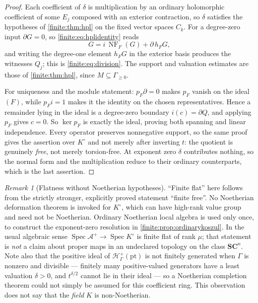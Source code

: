 \documentclass[11pt,letterpaper]{article}
\theoremstyle{definition}
\theoremstyle{remark}
\newtheorem{remark}[theorem]{Remark}
\newcommand{\SC}{\mathbf{SC}}
\newcommand{\Hp}{\mathscr H^{+}}
\newcommand{\Alg}{\mathcal A}
\newcommand{\Kc}{K^{\circ}}
\DeclareMathOperator{\NF}{NF}
\DeclareMathOperator{\Spec}{Spec}
\numberwithin{equation}{section}
\begin{document}
\begin{proof}
Each coefficient of $\delta$ is multiplication by an ordinary holomorphic coefficient of some $E_j$ composed with an exterior contraction, so $\delta$ satisfies the hypotheses of \cref{finite:thm:hpl} on the fixed vector spaces $C_k$. For a degree-zero input $\partial G=0$, so \eqref{finite:eq:hplidentity} reads
\[
 G=i\,\NF_F(G)+\partial\,h_FG,
\]
and writing the degree-one element $h_FG$ in the exterior basis produces the witnesses $Q_j$; this is \eqref{finite:eq:division}. The support and valuation estimates are those of \cref{finite:thm:hpl}, since $M\subseteq\Gamma_{\geq0}$.

For uniqueness and the module statement: $p_F\partial=0$ makes $p_F$ vanish on the ideal $(F)$, while $p_Fi=1$ makes it the identity on the chosen representatives. Hence a remainder lying in the ideal is a degree-zero boundary $i(c)=\partial Q$, and applying $p_F$ gives $c=0$. So $\ker p_F$ is exactly the ideal, proving both spanning and linear independence. Every operator preserves nonnegative support, so the same proof gives the assertion over $\Kc$ and not merely after inverting $t$: the quotient is genuinely \emph{free}, not merely torsion-free. At exponent zero $\delta$ contributes nothing, so the normal form and the multiplication reduce to their ordinary counterparts, which is the last assertion.
\end{proof}

\begin{remark}[Flatness without Noetherian hypotheses]
\label{finite:rem:nonnoetherian}
``Finite flat'' here follows from the strictly stronger, explicitly proved statement ``finite free''. No Noetherian deformation theorem is invoked for $\Kc$, which can have high-rank value group and need not be Noetherian. Ordinary Noetherian local algebra is used only once, to construct the exponent-zero resolution in \cref{finite:prop:ordinarykoszul}. In the usual algebraic sense $\Spec\Alg^+\to\Spec\Kc$ is finite flat of rank $\mu$; that statement is \emph{not} a claim about proper maps in an undeclared topology on the class $\SC^n$. Note also that the positive ideal of $\Hp_\Gamma(\mathrm{pt})$ is not finitely generated when $\Gamma$ is nonzero and divisible --- finitely many positive-valued generators have a least valuation $\delta>0$, and $t^{\delta/2}$ cannot lie in their ideal --- so a Noetherian completion theorem could not simply be assumed for this coefficient ring. This observation does not say that the \emph{field} $K$ is non-Noetherian.
\end{remark}
\end{document}
